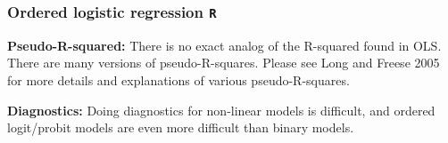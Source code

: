 \documentclass[00-GLMregslides.tex]{subfiles}
\begin{document}
\begin{frame}[fragile]
	\frametitle{Ordered logistic regression \texttt{R} }
	\Large
\textbf{Pseudo-R-squared: }There is no exact analog of the R-squared found in OLS. There are many versions of pseudo-R-squares. Please see Long and Freese 2005 for more details and explanations of various pseudo-R-squares.



\textbf{Diagnostics:} Doing diagnostics for non-linear models is difficult, and ordered logit/probit models are even more difficult than binary models.
\end{frame}


\end{document}
